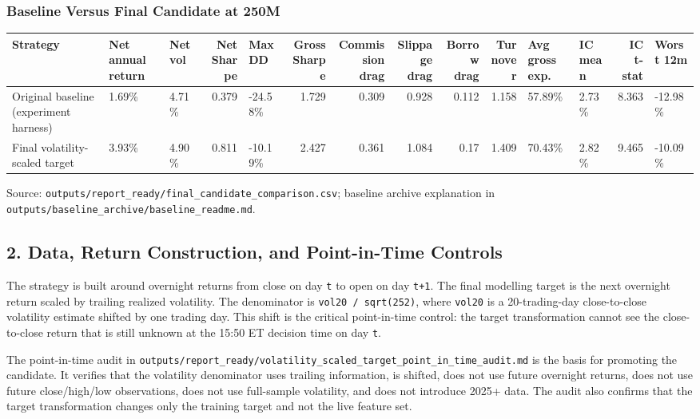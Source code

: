 \documentclass[
]{article}
\begin{document}
\hypertarget{baseline-versus-final-candidate-at-250m}{%
\subsubsection{Baseline Versus Final Candidate at
250M}\label{baseline-versus-final-candidate-at-250m}}

\begin{longtable}[]{@{}lllrlrrrrrllrl@{}}
\toprule
Strategy & Net annual return & Net vol & Net Sharpe & Max DD & Gross
Sharpe & Commission drag & Slippage drag & Borrow drag & Turnover & Avg
gross exp. & IC mean & IC t-stat & Worst 12m \\
\midrule
\endhead
Original baseline (experiment harness) & 1.69\% & 4.71\% & 0.379 &
-24.58\% & 1.729 & 0.309 & 0.928 & 0.112 & 1.158 & 57.89\% & 2.73\% &
8.363 & -12.98\% \\
Final volatility-scaled target & 3.93\% & 4.90\% & 0.811 & -10.19\% &
2.427 & 0.361 & 1.084 & 0.17 & 1.409 & 70.43\% & 2.82\% & 9.465 &
-10.09\% \\
\bottomrule
\end{longtable}

Source: \texttt{outputs/report\_ready/final\_candidate\_comparison.csv};
baseline archive explanation in
\texttt{outputs/baseline\_archive/baseline\_readme.md}.

\hypertarget{2-data-return-construction-and-point-in-time-controls}{%
\subsection{2. Data, Return Construction, and Point-in-Time
Controls}\label{2-data-return-construction-and-point-in-time-controls}}

The strategy is built around overnight returns from close on day
\texttt{t} to open on day \texttt{t+1}. The final modelling target is
the next overnight return scaled by trailing realized volatility. The
denominator is \texttt{vol20\ /\ sqrt(252)}, where \texttt{vol20} is a
20-trading-day close-to-close volatility estimate shifted by one trading
day. This shift is the critical point-in-time control: the target
transformation cannot see the close-to-close return that is still
unknown at the 15:50 ET decision time on day \texttt{t}.

The point-in-time audit in
\texttt{outputs/report\_ready/volatility\_scaled\_target\_point\_in\_time\_audit.md}
is the basis for promoting the candidate. It verifies that the
volatility denominator uses trailing information, is shifted, does not
use future overnight returns, does not use future close/high/low
observations, does not use full-sample volatility, and does not
introduce 2025+ data. The audit also confirms that the target
transformation changes only the training target and not the live feature
set.
\end{document}
